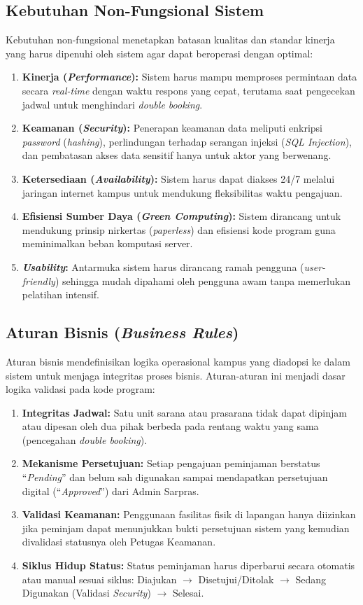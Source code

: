 \subsection{Kebutuhan Non-Fungsional Sistem}
Kebutuhan non-fungsional menetapkan batasan kualitas dan standar kinerja yang harus dipenuhi oleh sistem agar dapat beroperasi dengan optimal:
\begin{enumerate}
    \item \textbf{Kinerja (\textit{Performance}):} Sistem harus mampu memproses permintaan data secara \textit{real-time} dengan waktu respons yang cepat, terutama saat pengecekan jadwal untuk menghindari \textit{double booking}.
    \item \textbf{Keamanan (\textit{Security}):} Penerapan keamanan data meliputi enkripsi \textit{password} (\textit{hashing}), perlindungan terhadap serangan injeksi (\textit{SQL Injection}), dan pembatasan akses data sensitif hanya untuk aktor yang berwenang.
    \item \textbf{Ketersediaan (\textit{Availability}):} Sistem harus dapat diakses 24/7 melalui jaringan internet kampus untuk mendukung fleksibilitas waktu pengajuan.
    \item \textbf{Efisiensi Sumber Daya (\textit{Green Computing}):} Sistem dirancang untuk mendukung prinsip nirkertas (\textit{paperless}) dan efisiensi kode program guna meminimalkan beban komputasi server.
    \item \textbf{\textit{Usability}:} Antarmuka sistem harus dirancang ramah pengguna (\textit{user-friendly}) sehingga mudah dipahami oleh pengguna awam tanpa memerlukan pelatihan intensif.
\end{enumerate}

\subsection{Aturan Bisnis (\textit{Business Rules})}
Aturan bisnis mendefinisikan logika operasional kampus yang diadopsi ke dalam sistem untuk menjaga integritas proses bisnis. Aturan-aturan ini menjadi dasar logika validasi pada kode program:
\begin{enumerate}
    \item \textbf{Integritas Jadwal:} Satu unit sarana atau prasarana tidak dapat dipinjam atau dipesan oleh dua pihak berbeda pada rentang waktu yang sama (pencegahan \textit{double booking}).
    \item \textbf{Mekanisme Persetujuan:} Setiap pengajuan peminjaman berstatus ``\textit{Pending}'' dan belum sah digunakan sampai mendapatkan persetujuan digital (``\textit{Approved}'') dari Admin Sarpras.
    \item \textbf{Validasi Keamanan:} Penggunaan fasilitas fisik di lapangan hanya diizinkan jika peminjam dapat menunjukkan bukti persetujuan sistem yang kemudian divalidasi statusnya oleh Petugas Keamanan.
    \item \textbf{Siklus Hidup Status:} Status peminjaman harus diperbarui secara otomatis atau manual sesuai siklus: Diajukan $\rightarrow$ Disetujui/Ditolak $\rightarrow$ Sedang Digunakan (Validasi \textit{Security}) $\rightarrow$ Selesai.
\end{enumerate}

